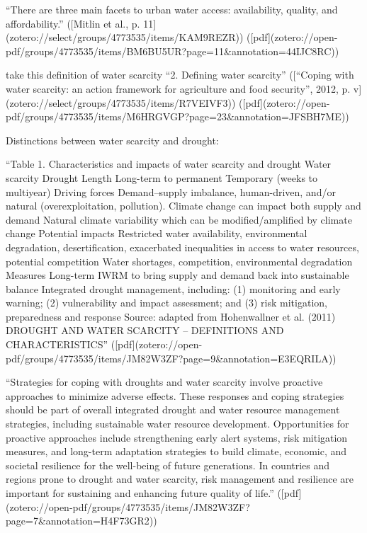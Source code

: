 “There are three main facets to urban water access: availability, quality, and affordability.” ([Mitlin et al., p. 11](zotero://select/groups/4773535/items/KAM9REZR)) ([pdf](zotero://open-pdf/groups/4773535/items/BM6BU5UR?page=11&annotation=44IJC8RC))


take this definition of water scarcity
“2. Defining water scarcity” ([“Coping with water scarcity: an action framework for agriculture and food security”, 2012, p. v](zotero://select/groups/4773535/items/R7VEIVF3)) ([pdf](zotero://open-pdf/groups/4773535/items/M6HRGVGP?page=23&annotation=JFSBH7ME))


Distinctions between water scarcity and drought:

“Table 1. Characteristics and impacts of water scarcity and drought Water scarcity Drought Length Long-term to permanent Temporary (weeks to multiyear) Driving forces Demand–supply imbalance, human-driven, and/or natural (overexploitation, pollution). Climate change can impact both supply and demand Natural climate variability which can be modified/amplified by climate change Potential impacts Restricted water availability, environmental degradation, desertification, exacerbated inequalities in access to water resources, potential competition Water shortages, competition, environmental degradation Measures Long-term IWRM to bring supply and demand back into sustainable balance Integrated drought management, including: (1) monitoring and early warning; (2) vulnerability and impact assessment; and (3) risk mitigation, preparedness and response Source: adapted from Hohenwallner et al. (2011) DROUGHT AND WATER SCARCITY – DEFINITIONS AND CHARACTERISTICS” ([pdf](zotero://open-pdf/groups/4773535/items/JM82W3ZF?page=9&annotation=E3EQRILA))

“Strategies for coping with droughts and water scarcity involve proactive approaches to minimize adverse effects. These responses and coping strategies should be part of overall integrated drought and water resource management strategies, including sustainable water resource development. Opportunities for proactive approaches include strengthening early alert systems, risk mitigation measures, and long-term adaptation strategies to build climate, economic, and societal resilience for the well-being of future generations. In countries and regions prone to drought and water scarcity, risk management and resilience are important for sustaining and enhancing future quality of life.” ([pdf](zotero://open-pdf/groups/4773535/items/JM82W3ZF?page=7&annotation=H4F73GR2))


